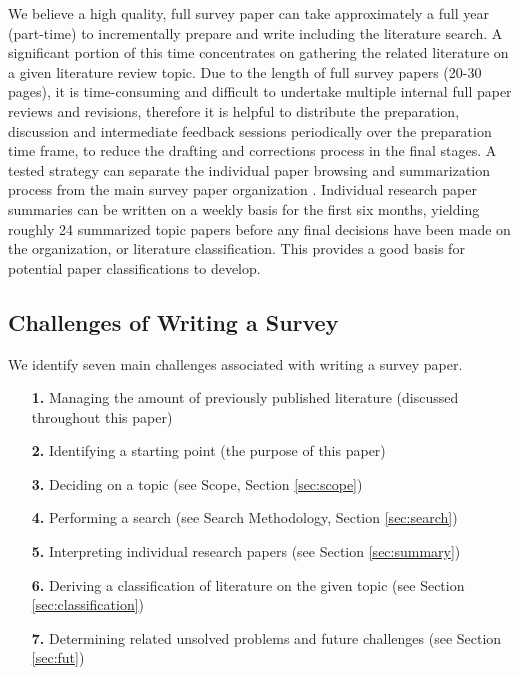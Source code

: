 We believe a high quality, full survey paper can take approximately a full year (part-time) to incrementally prepare and write including the literature search. A significant portion of this time concentrates on gathering the related literature on a given literature review topic. Due to the length of full survey papers (20-30 pages), it is time-consuming and difficult to undertake multiple internal full paper reviews and revisions, therefore it is helpful to distribute the preparation, discussion and intermediate feedback sessions periodically over the preparation time frame, to reduce the drafting and corrections process in the final stages. A tested strategy can separate the individual paper browsing and summarization process from the main survey paper organization \cite{laramee2010write}. Individual research paper summaries can be written on a weekly basis for the first six months, yielding roughly 24 summarized topic papers before any final decisions have been made on the organization, or literature classification. This provides a good basis for potential paper classifications to develop.

\subsection{Challenges of Writing a Survey} \label{sec:challenges}
We identify seven main challenges associated with writing a survey paper. 
\begin{itemize}[labelindent=0em, labelsep=0.2cm, leftmargin=*]
\item[\textbf{1.}] Managing the amount of previously published literature (discussed throughout this paper)
\item[\textbf{2.}] Identifying a starting point (the purpose of this paper)
\item[\textbf{3.}] Deciding on a topic (see Scope, Section \ref{sec:scope})
\item[\textbf{4.}] Performing a search (see Search Methodology, Section \ref{sec:search})
\item[\textbf{5.}] Interpreting individual research papers (see Section \ref{sec:summary})
\item[\textbf{6.}] Deriving a classification of literature on the given topic (see Section \ref{sec:classification})
\item[\textbf{7.}] Determining related unsolved problems and future challenges (see Section \ref{sec:fut})
\end{itemize}

